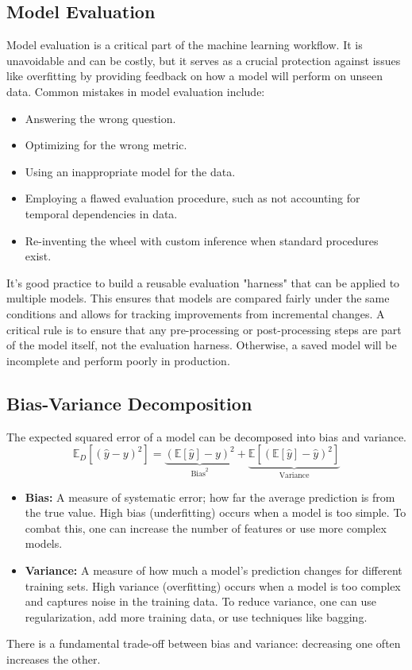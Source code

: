 \documentclass{article}
\begin{document}
\begin{multicols}{2}
\section{Model Evaluation}
Model evaluation is a critical part of the machine learning workflow. It is unavoidable and can be costly, but it serves as a crucial protection against issues like overfitting by providing feedback on how a model will perform on unseen data. Common mistakes in model evaluation include:
\begin{itemize}
    \item Answering the wrong question.
    \item Optimizing for the wrong metric.
    \item Using an inappropriate model for the data.
    \item Employing a flawed evaluation procedure, such as not accounting for temporal dependencies in data.
    \item Re-inventing the wheel with custom inference when standard procedures exist.
\end{itemize}

It's good practice to build a reusable evaluation "harness" that can be applied to multiple models. This ensures that models are compared fairly under the same conditions and allows for tracking improvements from incremental changes.
A critical rule is to ensure that any pre-processing or post-processing steps are part of the model itself, not the evaluation harness. Otherwise, a saved model will be incomplete and perform poorly in production.

\subsection{Bias-Variance Decomposition}
The expected squared error of a model can be decomposed into bias and variance.
$$ \mathbb{E}_{D}[(\hat{y} - y)^2] = \underbrace{(\mathbb{E}[\hat{y}] - y)^2}_{\text{Bias}^2} + \underbrace{\mathbb{E}[(\mathbb{E}[\hat{y}] - \hat{y})^2]}_{\text{Variance}} $$
\begin{itemize}
    \item \textbf{Bias:} A measure of systematic error; how far the average prediction is from the true value. High bias (underfitting) occurs when a model is too simple. To combat this, one can increase the number of features or use more complex models.
    \item \textbf{Variance:} A measure of how much a model's prediction changes for different training sets. High variance (overfitting) occurs when a model is too complex and captures noise in the training data. To reduce variance, one can use regularization, add more training data, or use techniques like bagging.
\end{itemize}
There is a fundamental trade-off between bias and variance: decreasing one often increases the other.


\end{multicols}
\end{document}
